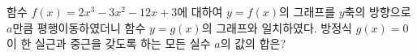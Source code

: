 함수 $f(x)=2x^3-3x^2-12x+3$에 대하여 $y=f(x)$의 그래프를 $y$축의 방향으로 $a$만큼 평행이동하였더니 함수 $y=g(x)$의 그래프와 일치하였다. 방정식 $g(x)=0$이 한 실근과 중근을 갖도록 하는 모든 실수 $a$의 값의 합은?
